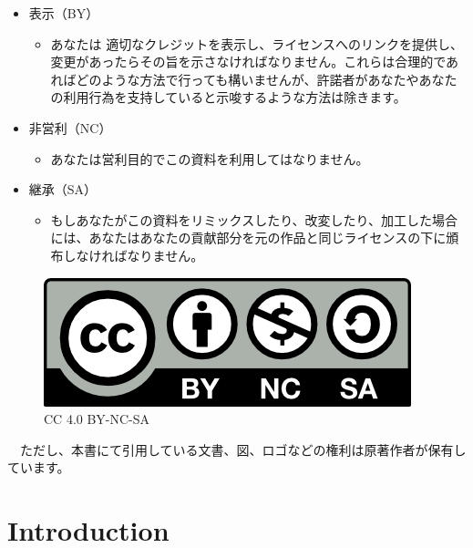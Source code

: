 \documentclass[
  12pt,
]{book}
\providecommand{\tightlist}{%
  \setlength{\itemsep}{0pt}\setlength{\parskip}{0pt}}
\begin{document}
\begin{warning-box}

\begin{itemize}
\item
  表示（BY）

  \begin{itemize}
  \tightlist
  \item
    あなたは 適切なクレジットを表示し、ライセンスへのリンクを提供し、変更があったらその旨を示さなければなりません。これらは合理的であればどのような方法で行っても構いませんが、許諾者があなたやあなたの利用行為を支持していると示唆するような方法は除きます。
  \end{itemize}
\item
  非営利（NC）

  \begin{itemize}
  \tightlist
  \item
    あなたは営利目的でこの資料を利用してはなりません。
  \end{itemize}
\item
  継承（SA）

  \begin{itemize}
  \tightlist
  \item
    もしあなたがこの資料をリミックスしたり、改変したり、加工した場合には、あなたはあなたの貢献部分を元の作品と同じライセンスの下に頒布しなければなりません。
  \end{itemize}
\end{itemize}

\end{warning-box}

\begin{figure}
\centering
\includegraphics{"./fig/by-nc-sa.png"}
\caption{CC 4.0 BY-NC-SA}
\end{figure}

　ただし、本書にて引用している文書、図、ロゴなどの権利は原著作者が保有しています。

\hypertarget{part-introduction}{%
\part{Introduction}\label{part-introduction}}
\end{document}
